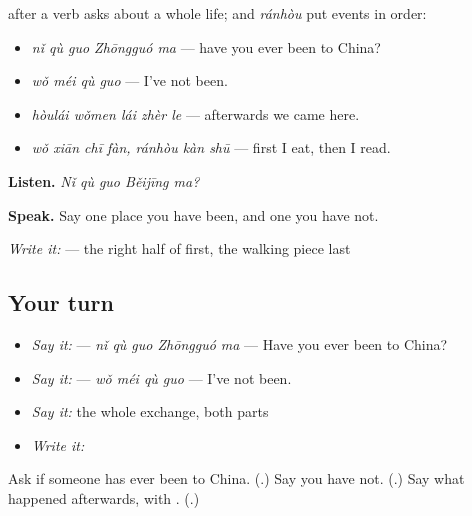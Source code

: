 \begin{grammarlens}[title={What you've built — ever, and what came next}]
 after a verb asks about a whole life;  and \emph{ránhòu} put events in order:

\begin{itemize}
\raggedright
  \item \textbf{} \emph{nǐ qù guo Zhōngguó ma} — have you ever been to China?
  \item \textbf{} \emph{wǒ méi qù guo} — I've not been.
  \item \textbf{} \emph{hòulái wǒmen lái zhèr le} — afterwards we came here.
  \item \emph{wǒ xiān chī fàn, ránhòu kàn shū} — first I eat, then I read.
\end{itemize}

\textbf{Listen.} \emph{Nǐ qù guo Běijīng ma?}

\textbf{Speak.} Say one place you have been, and one you have not.

\emph{Write it:}  — the right half of  first, the walking piece last
\end{grammarlens}

\subsection*{Your turn}
\begin{itemize}
\raggedright
  \item \emph{Say it:}  — \emph{nǐ qù guo Zhōngguó ma} — Have you ever been to China?
  \item \emph{Say it:}  — \emph{wǒ méi qù guo} — I've not been.
  \item \emph{Say it:} the whole exchange, both parts
  \item \emph{Write it:} 
\end{itemize}

\begin{tcolorbox}[breakable,colback=teal!4,colframe=teal!35!black,title={Before you move on}]
Ask if someone has ever been to China. (\textbf{}.) Say you have not. (\textbf{}.) Say what happened afterwards, with . (\textbf{}.)
\end{tcolorbox}
